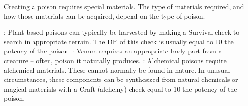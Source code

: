             Creating a poison requires special materials.
            The type of materials required, and how those materials can be acquired, depend on the type of poison.

            \begin{itemize}
                : Plant-based poisons can typically be harvested by making a Survival check to search in appropriate terrain.
                    The DR of this check is usually equal to 10 \add the potency of the poison.
                : Venom requires an appropriate body part from a creature -- often, poison it naturally produces.
                : Alchemical poisons require alchemical materials.
                    These cannot normally be found in nature.
                    In unusual circumstances, these components can be synthesized from natural chemicals or magical materials with a Craft (alchemy) check equal to 10 \add the potency of the poison.
            \end{itemize}
